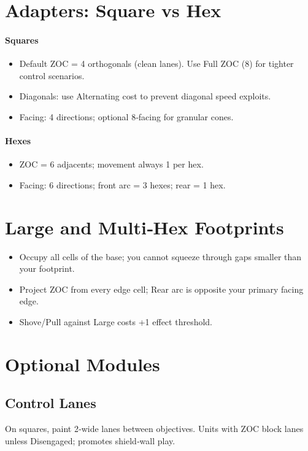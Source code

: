 \documentclass[11pt]{article}
\begin{document}
\section{Adapters: Square vs Hex}\label{sec:adapters}
\paragraph{Squares}
\begin{itemize}
  \item Default ZOC = 4 orthogonals (clean lanes). Use Full ZOC (8) for tighter control scenarios.
  \item Diagonals: use Alternating cost to prevent diagonal speed exploits.
  \item Facing: 4 directions; optional 8‑facing for granular cones.
\end{itemize}
\paragraph{Hexes}
\begin{itemize}
  \item ZOC = 6 adjacents; movement always 1 per hex.
  \item Facing: 6 directions; front arc = 3 hexes; rear = 1 hex.
\end{itemize}

\section{Large and Multi‑Hex Footprints}
\begin{itemize}
  \item Occupy all cells of the base; you cannot squeeze through gaps smaller than your footprint.
  \item Project ZOC from every edge cell; Rear arc is opposite your primary facing edge.
  \item Shove/Pull against Large costs +1 effect threshold.
\end{itemize}

\section{Optional Modules}
\subsection*{Control Lanes}
On squares, paint 2‑wide lanes between objectives. Units with ZOC block lanes unless Disengaged; promotes shield‑wall play.
\end{document}
